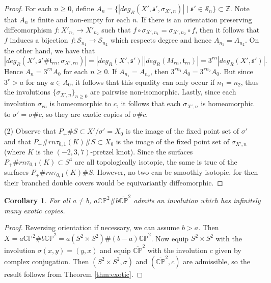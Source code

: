 \documentclass{amsart}
\newtheorem{corollary}[theorem]{Corollary}
\theoremstyle{definition}
\theoremstyle{remark}
\numberwithin{equation}{section}
\begin{document}
\begin{proof}
For each $n \ge 0$, define $A_n = \{ |deg_R( X' , \mathfrak{s}' , \sigma_{X',n})| \; | \; \mathfrak{s}' \in \mathcal{S}_n \} \subset \mathbb{Z}$. Note that $A_n$ is finite and non-empty for each $n$. If there is an orientation preserving diffeomorphism $f : X'_{n_1} \to X'_{n_2}$ such that $f \circ \sigma_{X',n_1} = \sigma_{X',n_2} \circ f$, then it follows that $f$ induces a bijection $f : \mathcal{S}_{n_1} \to \mathcal{S}_{n_2}$ which respects degree and hence $A_{n_1} = A_{n_2}$. On the other hand, we have that
\[
|deg_R( X' , \mathfrak{s}' \# \mathfrak{t}_{rn} , \sigma_{X',rn}) | = |deg_R(X' , \mathfrak{s}')| |deg_R(M_{rn} , \mathfrak{t}_{rn})| = 3^{rn} |deg_R( X' , \mathfrak{s}')|.
\]
Hence $A_n = 3^{rn}A_0$ for each $n \ge 0$. If $A_{n_1} = A_{n_2}$, then $3^{rn_1} A_0 = 3^{rn_2} A_0$. But since $3^r > a$ for any $a \in A_0$, it follows that this equality can only occur if $n_1 = n_2$, thus the involutions $\{ \sigma_{X',n} \}_{n \ge 0}$ are pairwise non-isomorphic. Lastly, since each involution $\sigma_{rn}$ is homeomorphic to $c$, it follows that each $\sigma_{X',n}$ is homeomorphic to $\sigma' = \sigma \# c$, so they are exotic copies of $\sigma \# c$.

(2) Observe that $P_+ \# S \subset X'/\sigma' = X_0$ is the image of the fixed point set of $\sigma'$ and that $P_+ \# rn \tau_{0,1}(K) \# S \subset X_0$ is the image of the fixed point set of $\sigma_{X',n}$ (where $K$ is the $(-2,3,7)$-pretzel knot). Since the surfaces $P_+ \# rn \tau_{0,1}(K) \subset S^4$ are all topologically isotopic, the same is true of the surfaces $P_+ \# rn \tau_{0,1}(K) \# S$. However, no two can be smoothly isotopic, for then their branched double covers would be equivariantly diffeomorphic.
\end{proof}

\begin{corollary}
For all $a\neq b$, $a \mathbb{CP}^2 \# b \overline{\mathbb{CP}}^2$ admits an involution which has infinitely many exotic copies.
\end{corollary}
\begin{proof}
Reversing orientation if necessary, we can assume $b > a$. Then $X = a \mathbb{CP}^2 \# b \overline{\mathbb{CP}}^2 = a(S^2 \times S^2) \# (b-a) \overline{\mathbb{CP}}^2$. Now equip $S^2 \times S^2$ with the involution $\sigma(x,y) = (y,x)$ and equip $\overline{\mathbb{CP}}^2$ with the involution $c$ given by complex conjugation. Then $(S^2 \times S^2 , \sigma)$ and $(\overline{\mathbb{CP}}^2 , c)$ are admissible, so the result follows from Theorem \ref{thm:exotic}.
\end{proof}
\end{document}
